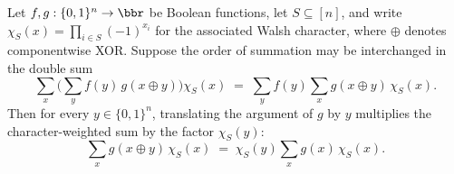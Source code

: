 \begin{lemma}
\label{BoolFourier.fourier_coeff_convolution_aux_h_char}
\leanok
{}
Let $f, g : \{0,1\}^n \to \bbr$ be Boolean functions, let $S \subseteq [n]$, and write
$\chi_S(x) = \prod_{i \in S}(-1)^{x_i}$ for the associated Walsh character, where
$\oplus$ denotes componentwise XOR. Suppose the order of summation may be interchanged
in the double sum
\[
  \sum_{x}\Big(\sum_{y} f(y)\,g(x \oplus y)\Big)\chi_S(x)
  \;=\;
  \sum_{y} f(y)\sum_{x} g(x \oplus y)\,\chi_S(x).
\]
Then for every $y \in \{0,1\}^n$, translating the argument of $g$ by $y$ multiplies the
character-weighted sum by the factor $\chi_S(y)$:
\[
  \sum_{x} g(x \oplus y)\,\chi_S(x)
  \;=\;
  \chi_S(y)\sum_{x} g(x)\,\chi_S(x).
\]
\end{lemma}
